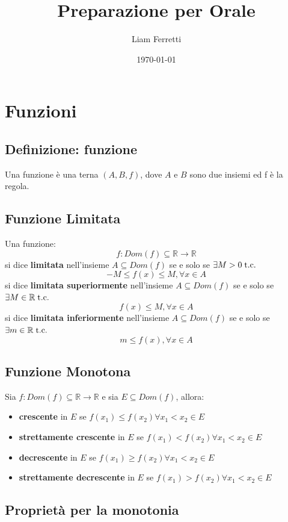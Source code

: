 \documentclass[a4paper,12pt,openright]{book}
\title{Preparazione per Orale}
\author{Liam Ferretti}
\date{\today}
\begin{document}
	
	\maketitle

	\tableofcontents
	
	\chapter{Funzioni}
	\section{Definizione: funzione}
	Una funzione è una terna $(A, B, f)$, dove $A$ e $B$ sono due insiemi ed f è la regola.
	\section{Funzione Limitata}
	Una funzione:
	\[f: Dom(f) \subseteq \mathbb{R} \longrightarrow \mathbb{R}\]
	si dice \textbf{limitata} nell'insieme $A \subseteq Dom(f)$ se e solo se $\exists M > 0 \;\text{t.c.}\;$
	\[-M \leq f(x) \leq M, \forall x \in A\]
	si dice \textbf{limitata superiormente} nell'insieme $A \subseteq Dom(f)$ se e solo se $\exists M \in \mathbb{R} \;\text{t.c.}\;$
	\[f(x) \leq M, \forall x \in A\]
	si dice \textbf{limitata inferiormente} nell'insieme $A \subseteq Dom(f)$ se e solo se $\exists m \in \mathbb{R} \;\text{t.c.}\;$
	\[m \leq f(x), \forall x \in A\]
	\section{Funzione Monotona}
	Sia $f: Dom(f) \subseteq \mathbb{R} \longrightarrow \mathbb{R}$ e sia $E \subseteq Dom(f)$, allora:
	\begin{itemize}
		\item \textbf{crescente} in $E$ se $f(x_1) \leq f(x_2) \forall x_1 < x_2 \in E$
		\item \textbf{strettamente crescente} in $E$ se $f(x_1) < f(x_2) \forall x_1 < x_2 \in E$
		\item \textbf{decrescente} in $E$ se $f(x_1) \geq f(x_2) \forall x_1 < x_2 \in E$
		\item \textbf{strettamente decrescente} in $E$ se $f(x_1) > f(x_2) \forall x_1 < x_2 \in E$
	\end{itemize}
	\section{Proprietà per la monotonia}
\end{document}
